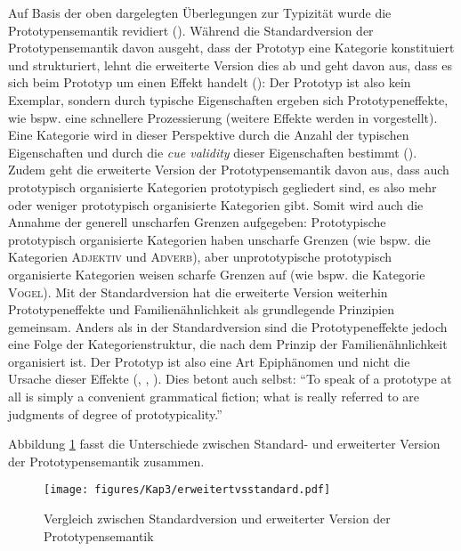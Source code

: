 Auf Basis der oben dargelegten Überlegungen zur Typizität wurde die Prototypensemantik revidiert (\cite[111--114]{Kleiber.1993}). Während die Standardversion der Prototypensemantik davon ausgeht, dass der Prototyp eine Kategorie konstituiert und strukturiert, lehnt die erweiterte Version dies ab und geht davon aus, dass es sich beim Prototyp um einen Effekt handelt (\cite[111--114]{Kleiber.1993}): Der Prototyp ist also kein Exemplar, sondern durch typische Eigenschaften ergeben sich Prototypeneffekte, wie bspw. eine schnellere Prozes\-sierung (weitere Effekte werden in  vorgestellt). Eine Kategorie wird in dieser Perspektive durch die Anzahl der typischen Eigenschaften und durch die \textit{cue validity} dieser Eigenschaften bestimmt (\cite[53]{Kleiber.1993}). Zudem geht die erweiterte Version der Prototypensemantik davon aus, dass auch prototypisch organisierte Kategorien prototypisch gegliedert sind, es also mehr oder weniger prototypisch organisierte Kategorien gibt. Somit wird auch die Annahme der generell unscharfen Grenzen aufgegeben: Prototypische prototypisch organisierte Kategorien haben unscharfe Grenzen (wie bspw. die Kategorien \textsc{Adjektiv} und \textsc{Adverb}), aber unprototypische prototypisch organisierte Kategorien weisen scharfe Grenzen auf (wie bspw. die Kategorie \textsc{Vogel}). Mit der Standardversion hat die erweiterte Version weiterhin Prototypeneffekte und Familienähnlichkeit als grundlegende Prinzipien gemeinsam. Anders als in der Standardversion sind die Prototypeneffekte jedoch eine Folge der Kategorienstruktur, die nach dem Prinzip der Familienähnlichkeit organisiert ist. Der Prototyp ist also eine Art Epiphänomen und nicht die Ursache dieser Effekte (\cite[56]{Lakoff.1987}, \cite[113]{Kleiber.1993}, \cite[254--256]{Blutner.1995}). Dies betont auch \textcite[101]{Rosch.2004} selbst: "`To speak of a prototype at all is simply a convenient grammatical fiction; what is really referred to are judgments of degree of prototypicality."'

Abbildung \ref{protstandard} fasst die Unterschiede zwischen Standard- und erweiterter Version der Prototypensemantik zusammen.

\begin{figure}
\texttt{[image: figures/Kap3/erweitertvsstandard.pdf]}  
\caption{Vergleich zwischen Standardversion und erweiterter Version der Prototypensemantik}
\label{protstandard}
\end{figure}

